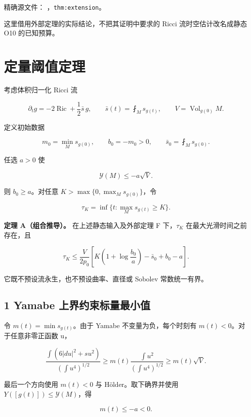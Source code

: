 \documentclass[UTF8,11pt,fontset=none]{ctexart}
\begin{document}
精确源文件： ，\texttt{thm:extension}。

这里借用外部定理的实际结论，不把其证明中要求的 Ricci 流时空估计改名成静态 O10 的已知预算。

\section{定量阈值定理}\label{ch7:ux5b9aux91cfux9608ux503cux5b9aux7406}

考虑体积归一化 Ricci 流

\[
 \partial_t g=-2\operatorname{Ric}+\frac12\bar s\,g,
 \qquad \bar s(t)=\fint_M s_{g(t)},
 \qquad V=\operatorname{Vol}_{g(0)}M.
\]

定义初始数据

\[
 m_0=\min_Ms_{g(0)},\qquad b_0=-m_0>0,
 \qquad \bar s_0=\fint_Ms_{g(0)}.
\]

任选 \(a>0\) 使

\[
 \mathcal Y(M)\le-a\sqrt V.
\]

则 \(b_0\ge a\)。对任意 \(K>\max\{0,\max_Ms_{g(0)}\}\)，令

\[
 \tau_K=\inf\{t:\max_Ms_{g(t)}\ge K\}.
\]

\textbf{定理 A（组合推导）。} 在上述静态输入及外部定理 F 下，\(\tau_K\) 在最大光滑时间之前存在，且

\[
 \boxed{
 \tau_K\le\frac{V}{2p_0}
 \left[
 K\left(1+\log\frac{b_0}{a}\right)-\bar s_0+b_0-a
 \right].
 }
\tag{7.1}\label{eq:r7:1}
\]

它既不预设流永生，也不预设曲率、直径或 Sobolev 常数统一有界。

\subsection{1 Yamabe 上界约束标量最小值}\label{ch7:yamabe-ux4e0aux754cux7ea6ux675fux6807ux91cfux6700ux5c0fux503c}

令 \(m(t)=\min s_{g(t)}\)。由于 Yamabe 不变量为负，每个时刻有 \(m(t)<0\)。对于任意非零正函数 u，

\[
 \frac{\int(6|du|^2+s u^2)}{(\int u^4)^{1/2}}
 \ge m(t)\frac{\int u^2}{(\int u^4)^{1/2}}
 \ge m(t)\sqrt V.
\]

最后一个方向使用 \(m(t)<0\) 与 Hölder。取下确界并使用 \(Y([g(t)])\le\mathcal Y(M)\)，得

\[
 \boxed{m(t)\le-a<0.}
\tag{7.2}\label{eq:r7:2}
\]
\end{document}
